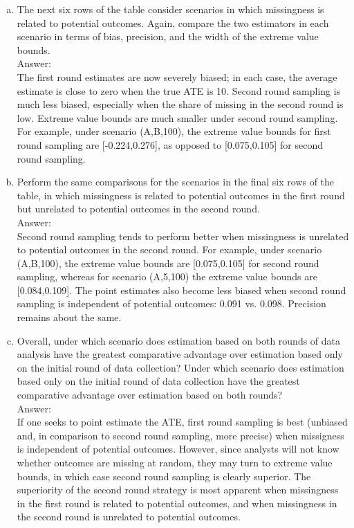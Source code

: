 \documentclass[11pt,notitlepage]{article}\usepackage[]{graphicx}\usepackage[]{color}
\begin{document}
\begin{enumerate}[a)]
\item The next six rows of the table consider scenarios in which missingness is related to potential outcomes. Again, compare the two estimators in each scenario in terms of bias, precision, and the width of the extreme value bounds.\\
Answer:\\
The first round estimates are now severely biased; in each case, the average estimate is close to zero when the true ATE is 10.  Second round sampling is much less biased, especially when the share of missing in the second round is low.  Extreme value bounds are much smaller under second round sampling. For example, under scenario (A,B,100), the extreme value bounds for first round sampling are [-0.224,0.276], as opposed to [0.075,0.105] for second round sampling.
\item Perform the same comparisons for the scenarios in the final six rows of the table, in which missingness is related to potential outcomes in the first round but unrelated to potential outcomes in the second round.\\
Answer:\\
Second round sampling tends to perform better when missingness is unrelated to potential outcomes in the second round.  For example, under scenario (A,B,100), the extreme value bounds are [0.075,0.105] for second round sampling, whereas for scenario (A,5,100) the extreme value bounds are [0.084,0.109]. The point estimates also become less biased when second round sampling is independent of potential outcomes: 0.091 vs. 0.098.  Precision remains about the same.

\item Overall, under which scenario does estimation based on both rounds of data analysis have the greatest comparative advantage over estimation based only on the initial round of data collection? Under which scenario does estimation based only on the initial round of data collection have the greatest comparative advantage over estimation based on both rounds?\\
Answer:\\
If one seeks to point estimate the ATE, first round sampling is best (unbiased and, in comparison to second round sampling, more precise) when missigness is independent of potential outcomes.  However, since analysts will not know whether outcomes are missing at random, they may turn to extreme value bounds, in which case second round sampling is clearly superior.  The superiority of the second round strategy is most apparent when missingness in the first round is related to potential outcomes, and when missingness in the second round is unrelated to potential outcomes.  
\end{enumerate}
\end{document}
